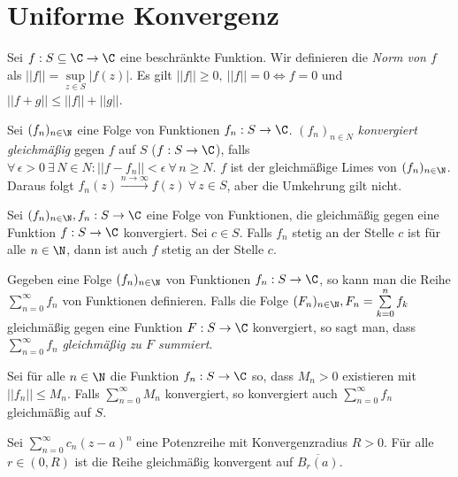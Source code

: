 \section{Uniforme Konvergenz}\lecture
		
		Sei $ f: S \subseteq \C \to \C $ eine beschränkte Funktion. Wir definieren die \emph{Norm von $f$} als $ ||f||=\sup\limits_{z \in S} |f(z)| $. Es gilt $ ||f|| \geq 0,\ ||f||=0 \iff f=0 $ und $ ||f+g|| \leq ||f||+||g|| $. 
		
		\begin{defn*}
			Sei $ (f_n)_{n \in \N} $ eine Folge von Funktionen $ f_n: S \to \C $. $ (f_n)_{n \in N} $ \emph{konvergiert gleichmäßig} gegen $f$ auf $S$ ($ f: S \to \C $), falls $ \forall\, \epsilon > 0 \ \exists\, N \in N: ||f-f_n|| < \epsilon \ \forall\, n \geq N $. $f$ ist der gleichmäßige Limes von $ (f_n)_{n \in \N} $. Daraus folgt $ f_n(z) \overset{n \to \infty}{\longrightarrow} f(z) \ \forall\, z \in S $, aber die Umkehrung gilt nicht.
		\end{defn*}
		
		\begin{thm}
			Sei $ (f_n)_{n \in \N}, f_n:S \to \C $ eine Folge von Funktionen, die gleichmäßig gegen eine Funktion $ f: S \to \C $ konvergiert. Sei $c \in S$. Falls $ f_n $ stetig an der Stelle $c$ ist für alle $n \in \N$, dann ist auch $f$ stetig an der Stelle $c$. 
		\end{thm}
		
		\begin{defn*}
			Gegeben eine Folge $ (f_n)_{n \in \N} $ von Funktionen $ f_n: S \to \C $, so kann man die Reihe $ \sum\limits_{n=0}^\infty f_n $ von Funktionen definieren. Falls die Folge $ (F_n)_{n \in \N}, F_n = \sum\limits_{k=0}^n f_k $ gleichmäßig gegen eine Funktion $ F: S \to \C $ konvergiert, so sagt man, dass $ \sum\limits_{n=0}^\infty f_n $ \emph{gleichmäßig zu $F$ summiert}.
		\end{defn*}
		
		\begin{thmn}
			Sei für alle $ n \in \N $ die Funktion $ f_n:S \to \C $ so, dass $ M_n > 0 $ existieren mit $ ||f_n|| \leq M_n $. Falls $ \sum\limits_{n=0}^\infty M_n $ konvergiert, so konvergiert auch $ \sum\limits_{n=0}^\infty f_n $ gleichmäßig auf $S$.
		\end{thmn}
		
		\begin{cor}
			Sei $ \sum\limits_{n=0}^\infty c_n (z-a)^n $ eine Potenzreihe mit Konvergenzradius $ R > 0 $. Für alle $ r \in (0,R) $ ist die Reihe gleichmäßig konvergent auf $ \overbar{B_r(a)} $.
		\end{cor}
		
